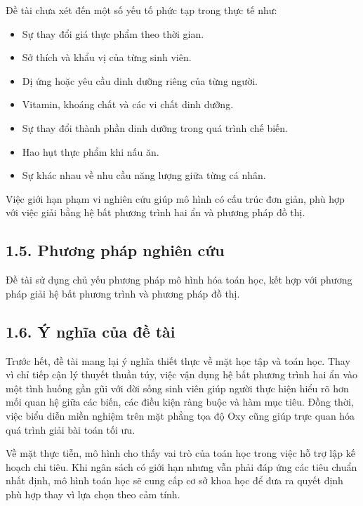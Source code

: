 \documentclass[12pt,a4paper]{article}
\begin{document}
Đề tài chưa xét đến một số yếu tố phức tạp trong thực tế như:

\begin{itemize}
    \item Sự thay đổi giá thực phẩm theo thời gian.
    \item Sở thích và khẩu vị của từng sinh viên.
    \item Dị ứng hoặc yêu cầu dinh dưỡng riêng của từng người.
    \item Vitamin, khoáng chất và các vi chất dinh dưỡng.
    \item Sự thay đổi thành phần dinh dưỡng trong quá trình chế biến.
    \item Hao hụt thực phẩm khi nấu ăn.
    \item Sự khác nhau về nhu cầu năng lượng giữa từng cá nhân.
\end{itemize}

Việc giới hạn phạm vi nghiên cứu giúp mô hình có cấu trúc đơn giản, phù hợp với việc giải bằng hệ bất phương trình hai ẩn và phương pháp đồ thị.



\subsection*{1.5. Phương pháp nghiên cứu}

Đề tài sử dụng chủ yếu phương pháp mô hình hóa toán học, kết hợp với phương pháp giải hệ bất phương trình và phương pháp đồ thị.



\subsection*{1.6. Ý nghĩa của đề tài}

Trước hết, đề tài mang lại ý nghĩa thiết thực về mặt học tập và toán học. Thay vì chỉ tiếp cận lý thuyết thuần túy, việc vận dụng hệ bất phương trình hai ẩn vào một tình huống gần gũi với đời sống sinh viên giúp người thực hiện hiểu rõ hơn mối quan hệ giữa các biến, các điều kiện ràng buộc và hàm mục tiêu. Đồng thời, việc biểu diễn miền nghiệm trên mặt phẳng tọa độ Oxy cũng giúp trực quan hóa quá trình giải bài toán tối ưu.

Về mặt thực tiễn, mô hình cho thấy vai trò của toán học trong việc hỗ trợ lập kế hoạch chi tiêu. Khi ngân sách có giới hạn nhưng vẫn phải đáp ứng các tiêu chuẩn nhất định, mô hình toán học sẽ cung cấp cơ sở khoa học để đưa ra quyết định phù hợp thay vì lựa chọn theo cảm tính.
\end{document}
